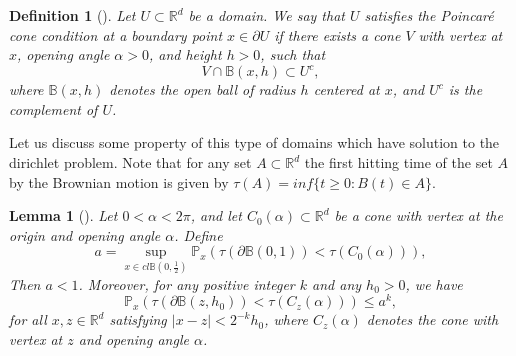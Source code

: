 \documentclass[11pt, a4paper, oneside]{report}
\numberwithin{equation}{section}
\newtheorem{lemma}[theorem]{Lemma}
\newtheorem{definition}[theorem]{Definition}
\begin{document}
\begin{definition}
[{\cite[Definition 3.10]{PeresMortersBook}}]
Let \( U \subset \mathbb{R}^d \) be a domain. We say that \( U \) satisfies the \emph{Poincaré cone condition} at a boundary point \( x \in \partial U \) if there exists a cone \( V \) with vertex at \( x \), opening angle \( \alpha > 0 \), and height \( h > 0 \), such that
\[
V \cap \mathbb{B}(x, h) \subset U^c,
\]
where \( \mathbb{B}(x, h) \) denotes the open ball of radius \( h \) centered at \( x \), and \( U^c \) is the complement of \( U \).
\end{definition}
\noindent Let us discuss some property of this type of domains which have solution to the dirichlet problem. Note that for any set \(A \subset \mathbb{R}^d\) the first hitting time of the set \(A\) by the Brownian motion is given by \(\tau(A) = inf\{ t \geq 0 : B(t) \in A\}\).
\begin{lemma}[{\cite[Lemma 3.11]{PeresMortersBook}}]
Let \( 0 < \alpha < 2\pi \), and let \( C_0(\alpha) \subset \mathbb{R}^d \) be a cone with vertex at the origin and opening angle \( \alpha \). Define
\[
a = \sup_{x \in cl \mathbb{B}(0, \frac{1}{2})} \mathbb{P}_x\left( \tau(\partial \mathbb{B}(0,1)) < \tau(C_0(\alpha)) \right),
\]
Then \( a < 1 \). Moreover, for any positive integer \( k \) and any \( h_0 > 0 \), we have
\[
\mathbb{P}_x\left( \tau(\partial \mathbb{B}(z, h_0)) < \tau(C_z(\alpha)) \right) \leq a^k,
\]
for all \( x, z \in \mathbb{R}^d \) satisfying \( |x - z| < 2^{-k} h_0 \), where \( C_z(\alpha) \) denotes the cone with vertex at \( z \) and opening angle \( \alpha \).

\end{lemma}
\end{document}
